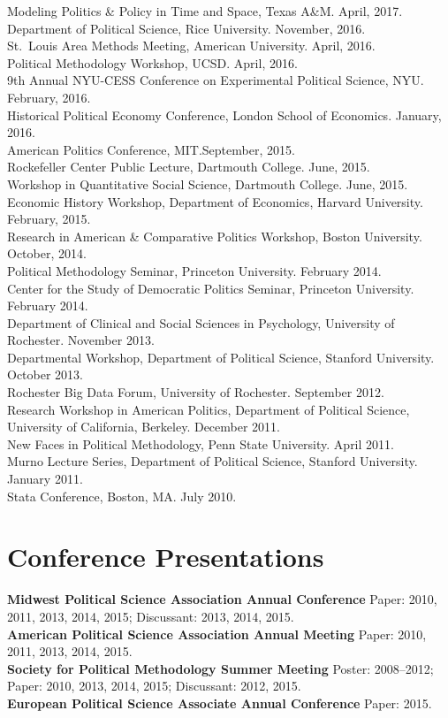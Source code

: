 \documentclass[margin,line,12pt]{res}
\begin{document}
\begin{resume}
Modeling Politics & Policy in Time and Space, Texas A&M. April, 2017. \\ 
Department of Political Science, Rice University. November, 2016. \\
St.\ Louis Area Methods Meeting, American University. April, 2016. \\
Political Methodology Workshop, UCSD. April, 2016. \\
9th Annual NYU-CESS Conference on Experimental Political Science, NYU. February, 2016. \\
Historical Political Economy Conference, London School of Economics. January, 2016. \\
American Politics Conference, MIT.\@ September, 2015. \\
Rockefeller Center Public Lecture, Dartmouth College. June, 2015.\\
Workshop in Quantitative Social Science, Dartmouth College. June, 2015.\\
Economic History Workshop, Department of Economics, Harvard University. February, 2015.\\
Research in American \& Comparative Politics Workshop, Boston University. October, 2014.\\
Political Methodology Seminar, Princeton University. February 2014. \\
Center for the Study of Democratic Politics Seminar, Princeton University. February 2014.\\
Department of Clinical and Social Sciences in Psychology, University of Rochester. November 2013.\\
Departmental Workshop, Department of Political Science, Stanford University. October 2013.\\
Rochester Big Data Forum, University of Rochester. September 2012.\\
Research Workshop in American Politics, Department of Political Science, University of California, Berkeley. December 2011.\\
New Faces in Political Methodology, Penn State University. April 2011. \\
Murno Lecture Series, Department of Political Science, Stanford University. January 2011. \\
Stata Conference, Boston, MA\@. July 2010.

\section{\textsf{\sc Conference Presentations}}
{\bf Midwest Political Science Association Annual Conference} Paper: 2010, 2011, 2013, 2014, 2015; Discussant: 2013, 2014, 2015.\\
{\bf American Political Science Association Annual Meeting} Paper: 2010, 2011, 2013, 2014, 2015.\\
{\bf Society for Political Methodology Summer Meeting} Poster: 2008--2012; Paper: 2010, 2013, 2014, 2015; Discussant: 2012, 2015.\\
{\bf European Political Science Associate Annual Conference} Paper: 2015.\\ 


\end{resume}
\end{document}
